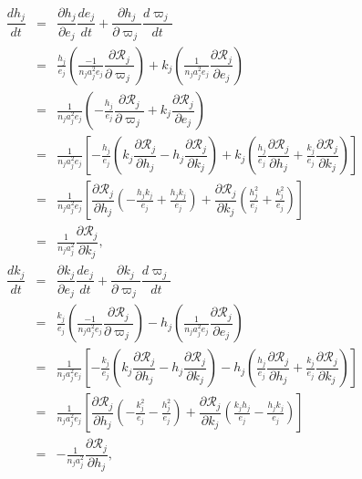 \documentclass [12pt, a4paper] {article}
\newcommand{\pdiff}[2]
{
	\dfrac{\partial #1}{\partial #2}
}
\newcommand{\diff}[2]
{
	\dfrac{d #1}{d #2}
}
\begin{document}
\begin {eqnarray}
    \diff{h_j}{t}
    &=&
    \pdiff{h_j}{e_j}\diff{e_j}{t}
    +
    \pdiff{h_j}{\varpi_j}\diff{\varpi_j}{t}
    \\
    &=&
    \frac{h_j}{e_j}
    \left(
        \frac{-1}{n_ja_j^2e_j}\pdiff{\mathcal{R}_j}{\varpi_j}
    \right)
    + 
    k_j 
    \left(
        \frac{1}{n_ja_j^2e_j}\pdiff{\mathcal{R}_j}{e_j}
    \right)
    \\
    &=& 
    \frac{1}{n_ja_j^2e_j}
    \left(
        -\frac{h_j}{e_j}\pdiff{\mathcal{R}_j}{\varpi_j}
        + 
        k_j\pdiff{\mathcal{R}_j}{e_j}
    \right)
    \\
    &=& 
    \frac{1}{n_ja_j^2e_j}
    \left[
        -\frac{h_j}{e_j}
        \left(
            k_j\pdiff{\mathcal{R}_j}{h_j} - h_j \pdiff{\mathcal{R}_j}{k_j}
        \right)
        + 
        k_j
        \left(
            \frac{h_j}{e_j}\pdiff{\mathcal{R}_j}{h_j}
            +
            \frac{k_j}{e_j}\pdiff{\mathcal{R}_j}{k_j}
        \right)
    \right]
    \\
    &=&
     \frac{1}{n_ja_j^2e_j}
     \left[
        \pdiff{\mathcal{R}_j}{h_j}
        \left(
            -\frac{h_jk_j}{e_j}
            +
            \frac{h_jk_j}{e_j}
        \right)
        +
        \pdiff{\mathcal{R}_j}{k_j}
        \left(
            \frac{h_j^2}{e_j}
            +
            \frac{k_j^2}{e_j}
        \right)
     \right]
     \\
     &=& 
     \frac{1}{n_ja_j^2}\pdiff{\mathcal{R}_j}{k_j},
\end {eqnarray}
\begin {eqnarray}
    \diff{k_j}{t}
    &=& 
    \pdiff{k_j}{e_j}\diff{e_j}{t} + \pdiff{k_j}{\varpi_j}\diff{\varpi_j}{t}
    \\
    &=&
    \frac{k_j}{e_j}
    \left(
        \frac{-1}{n_ja_j^2e_j}\pdiff{\mathcal{R}_j}{\varpi_j}
    \right)
    - 
    h_j 
    \left(
         \frac{1}{n_ja_j^2e_j}\pdiff{\mathcal{R}_j}{e_j}
    \right)
    \\
    &=&
    \frac{1}{n_ja_j^2e_j}
    \left[
        -\frac{k_j}{e_j}
        \left(
            k_j\pdiff{\mathcal{R}_j}{h_j}
            -
            h_j\pdiff{\mathcal{R}_j}{k_j}
        \right)
        - h_j
        \left(
            \frac{h_j}{e_j}\pdiff{\mathcal{R}_j}{h_j}
            + 
            \frac{k_j}{e_j}\pdiff{\mathcal{R}_j}{k_j}
        \right)
    \right]
    \\
    &=&
    \frac{1}{n_ja_j^2e_j}
    \left[
        \pdiff{\mathcal{R}_j}{h_j}
        \left(
            -\frac{k_j^2}{e_j}
            -\frac{h_j^2}{e_j}
        \right)
        +
        \pdiff{\mathcal{R}_j}{k_j}
        \left(
            \frac{k_jh_j}{e_j}
            -
            \frac{h_jk_j}{e_j}
        \right)
    \right]
    \\
    &=& 
    -\frac{1}{n_ja_j^2}\pdiff{\mathcal{R}_j}{h_j},
\end {eqnarray}
\end{document}
